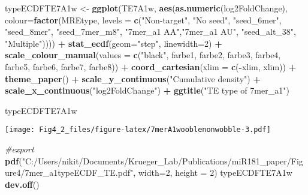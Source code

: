 \documentclass[
]{article}
\newenvironment{Shaded}{\begin{snugshade}}{\end{snugshade}}
\newcommand{\AttributeTok}[1]{\textcolor[rgb]{0.13,0.29,0.53}{#1}}
\newcommand{\CommentTok}[1]{\textcolor[rgb]{0.56,0.35,0.01}{\textit{#1}}}
\newcommand{\DecValTok}[1]{\textcolor[rgb]{0.00,0.00,0.81}{#1}}
\newcommand{\FunctionTok}[1]{\textcolor[rgb]{0.13,0.29,0.53}{\textbf{#1}}}
\newcommand{\NormalTok}[1]{#1}
\newcommand{\OtherTok}[1]{\textcolor[rgb]{0.56,0.35,0.01}{#1}}
\newcommand{\SpecialCharTok}[1]{\textcolor[rgb]{0.81,0.36,0.00}{\textbf{#1}}}
\newcommand{\StringTok}[1]{\textcolor[rgb]{0.31,0.60,0.02}{#1}}
\begin{document}
\begin{Shaded}
\begin{Highlighting}[]
\NormalTok{typeECDFTE7A1w }\OtherTok{\textless{}{-}} \FunctionTok{ggplot}\NormalTok{(TE7A1w, }\FunctionTok{aes}\NormalTok{(}\FunctionTok{as.numeric}\NormalTok{(log2FoldChange), }
                              \AttributeTok{colour=}\FunctionTok{factor}\NormalTok{(MREtype, }\AttributeTok{levels =} \FunctionTok{c}\NormalTok{(}\StringTok{"Non{-}target"}\NormalTok{, }\StringTok{"No seed"}\NormalTok{, }\StringTok{"seed\_6mer"}\NormalTok{, }\StringTok{"seed\_8mer"}\NormalTok{, }\StringTok{"seed\_7mer\_m8"}\NormalTok{, }\StringTok{"7mer\_a1 AA"}\NormalTok{,}\StringTok{"7mer\_a1 AU"}\NormalTok{, }\StringTok{"seed\_alt\_38"}\NormalTok{, }\StringTok{"Multiple"}\NormalTok{)))) }\SpecialCharTok{+} 
  \FunctionTok{stat\_ecdf}\NormalTok{(}\AttributeTok{geom=}\StringTok{"step"}\NormalTok{, }\AttributeTok{linewidth=}\DecValTok{2}\NormalTok{) }\SpecialCharTok{+}
  \FunctionTok{scale\_colour\_manual}\NormalTok{(}\AttributeTok{values =} \FunctionTok{c}\NormalTok{(}\StringTok{"black"}\NormalTok{, farbe1, farbe2, farbe3, farbe4, farbe5, farbe6, farbe7, farbe8)) }\SpecialCharTok{+}
  \FunctionTok{coord\_cartesian}\NormalTok{(}\AttributeTok{xlim =} \FunctionTok{c}\NormalTok{(}\SpecialCharTok{{-}}\NormalTok{xlim, xlim)) }\SpecialCharTok{+} 
  \FunctionTok{theme\_paper}\NormalTok{() }\SpecialCharTok{+}
  \FunctionTok{scale\_y\_continuous}\NormalTok{(}\StringTok{"Cumulative density"}\NormalTok{) }\SpecialCharTok{+} \FunctionTok{scale\_x\_continuous}\NormalTok{(}\StringTok{"log2FoldChange"}\NormalTok{) }\SpecialCharTok{+}
  \FunctionTok{ggtitle}\NormalTok{(}\StringTok{"TE type of 7mer\_a1"}\NormalTok{)}

\NormalTok{typeECDFTE7A1w}
\end{Highlighting}
\end{Shaded}

\texttt{[image: Fig4\_2\_files/figure-latex/7merA1wooblenonwobble-3.pdf]}

\begin{Shaded}
\begin{Highlighting}[]
\CommentTok{\#export}
\FunctionTok{pdf}\NormalTok{(}\StringTok{"C:/Users/nikit/Documents/Krueger\_Lab/Publications/miR181\_paper/Figure4/7mer\_a1typeECDF\_TE.pdf"}\NormalTok{, }\AttributeTok{width=}\DecValTok{2}\NormalTok{, }\AttributeTok{height =} \DecValTok{2}\NormalTok{)}
\NormalTok{typeECDFTE7A1w}
\FunctionTok{dev.off}\NormalTok{()}
\end{Highlighting}
\end{Shaded}
\end{document}
